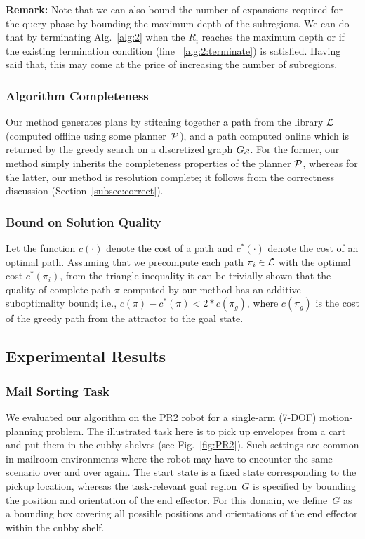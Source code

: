 \documentclass[a4paper,10pt]{article}
\begin{document}
%
\textbf{Remark:}
Note that we can also bound the number of expansions required for the query phase by bounding the maximum depth of the subregions. We can do that by terminating Alg.~\ref{alg:2} when the $R_i$ reaches the maximum depth or if the existing termination condition (line ~\ref{alg:2:terminate}) is satisfied.
Having said that, this may come at the price of increasing the number of subregions.

\subsubsection{Algorithm Completeness}
\label{subsec:completeness}
Our method generates plans by stitching together a path from the library $\mathcal{L}$ (computed offline using some planner~$\mathcal{P}$), and a path computed online which is returned by the greedy search on a discretized graph $G_\mathcal{S}$. For the former, our method simply inherits the completeness properties of the planner $\mathcal{P}$, whereas for the latter, our method is resolution complete; it follows from the correctness discussion (Section~\ref{subsec:correct}). 

\subsubsection{Bound on Solution Quality}
\label{subsec:quality}
Let the function $c(\cdot)$ denote the cost of a path and $c^*(\cdot)$ denote the cost of an optimal path. Assuming that we precompute each path $\pi_i \in \mathcal{L}$ with the optimal cost $c^*(\pi_i)$, from the triangle inequality it can be trivially shown that the quality of complete path $\pi$ computed by our method has an additive suboptimality bound; i.e.,
 $c(\pi) - c^*(\pi) < 2 * c(\pi_g)$,
where $c(\pi_g)$ is the cost of the greedy path from the attractor to the goal state.

\subsection{Experimental Results}
\label{sec:eval}

\subsubsection{Mail Sorting Task}

We evaluated our algorithm on the PR2 robot for a single-arm (7-DOF) motion-planning problem. The illustrated task here is to pick up envelopes from a cart and put them in the cubby shelves (see Fig.~\ref{fig:PR2}). Such settings are common in mailroom environments where the robot may have to encounter the same scenario over and over again. The start state is a fixed state corresponding to the pickup location, whereas the task-relevant goal region~$G$ is specified by bounding the position and orientation of the end effector. For this domain, we define~$G$ as a bounding box covering all possible positions and orientations of the end effector within the cubby shelf.
\end{document}

